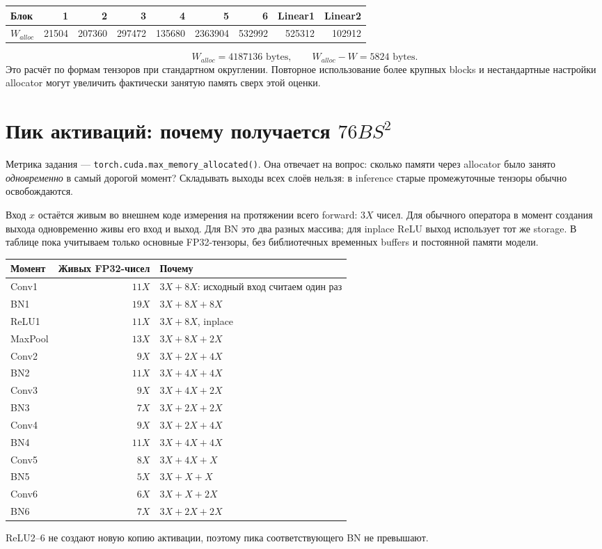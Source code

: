 \documentclass[11pt,a4paper]{article}
\newcommand{\bytes}{\text{ bytes}}
\newcommand{\page}[1]{\clearpage\section{#1}}
\begin{document}
\begin{center}\small
\begin{tabular}{lrrrrrrrr}
\toprule
Блок & 1 & 2 & 3 & 4 & 5 & 6 & Linear1 & Linear2 \\
\midrule
$W_{alloc}$ & 21504 & 207360 & 297472 & 135680 & 2363904 & 532992 & 525312 & 102912 \\
\bottomrule
\end{tabular}\end{center}
\[
 \boxed{W_{alloc}=4187136\bytes,\qquad W_{alloc}-W=5824\bytes.}
\]
Это расчёт по формам тензоров при стандартном округлении. Повторное
использование более крупных blocks и нестандартные настройки allocator
могут увеличить фактически занятую память сверх этой оценки.

\page{Пик активаций: почему получается $76BS^2$}
Метрика задания --- \texttt{torch.cuda.max\_memory\_allocated()}.
Она отвечает на вопрос: сколько памяти через allocator было занято
\emph{одновременно} в самый дорогой момент? Складывать выходы всех слоёв нельзя:
в inference старые промежуточные тензоры обычно освобождаются.

Вход $x$ остаётся живым во внешнем коде измерения на протяжении всего forward:
$3X$ чисел. Для обычного оператора в момент создания выхода одновременно
живы его вход и выход. Для BN это два разных массива; для inplace ReLU
выход использует тот же storage. В таблице пока учитываем только основные
FP32-тензоры, без библиотечных временных buffers и постоянной памяти модели.

\begin{center}
\begin{tabular}{lrl}
\toprule
Момент & Живых FP32-чисел & Почему \\
\midrule
Conv1 & $11X$ & $3X+8X$: исходный вход считаем один раз \\
BN1 & $19X$ & $3X+8X+8X$ \\
ReLU1 & $11X$ & $3X+8X$, inplace \\
MaxPool & $13X$ & $3X+8X+2X$ \\
Conv2 & $9X$ & $3X+2X+4X$ \\
BN2 & $11X$ & $3X+4X+4X$ \\
Conv3 & $9X$ & $3X+4X+2X$ \\
BN3 & $7X$ & $3X+2X+2X$ \\
Conv4 & $9X$ & $3X+2X+4X$ \\
BN4 & $11X$ & $3X+4X+4X$ \\
Conv5 & $8X$ & $3X+4X+X$ \\
BN5 & $5X$ & $3X+X+X$ \\
Conv6 & $6X$ & $3X+X+2X$ \\
BN6 & $7X$ & $3X+2X+2X$ \\
\bottomrule
\end{tabular}
\end{center}
ReLU2--6 не создают новую копию активации, поэтому пика соответствующего
BN не превышают.
\end{document}
